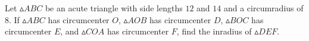 Let $\vartriangle ABC$ be an acute triangle with side lengths $12$ and $14$ and a circumradius of $8$. If $\vartriangle ABC$ has circumcenter $O$, $\vartriangle AOB$ has circumcenter $D$, $\vartriangle BOC$ has circumcenter $E$, and $\vartriangle COA$ has circumcenter $F$, find the inradius of $\vartriangle DEF$.
